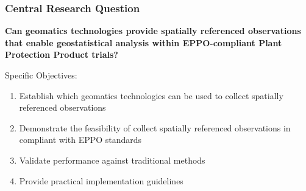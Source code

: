 \documentclass[aspectratio=43]{beamer}
\begin{document}
\begin{frame}
    \frametitle{Central Research Question}
    
    \begin{exampleblock}{}
        \large
        \textbf{Can geomatics technologies provide spatially referenced observations that enable geostatistical analysis within EPPO-compliant Plant Protection Product trials?}
    \end{exampleblock}
    
    \vspace{1em}
    
    \begin{block}{Specific Objectives:}
        \begin{enumerate}
            \item Establish which geomatics technologies can be used to collect spatially referenced observations
            \item Demonstrate the feasibility of collect spatially referenced observations in compliant with EPPO standards
            \item Validate performance against traditional methods
            \item Provide practical implementation guidelines
        \end{enumerate}
    \end{block}
\end{frame}
\end{document}
